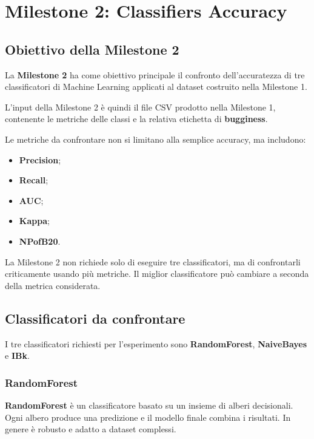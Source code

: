 \chapter{Milestone 2: Classifiers Accuracy}

\section{Obiettivo della Milestone 2}

La \textbf{Milestone 2} ha come obiettivo principale il confronto dell'accuratezza di tre classificatori di Machine Learning applicati al dataset costruito nella Milestone 1.

L'input della Milestone 2 è quindi il file CSV prodotto nella Milestone 1, contenente le metriche delle classi e la relativa etichetta di \textbf{bugginess}.

Le metriche da confrontare non si limitano alla semplice accuracy, ma includono:

\begin{itemize}
    \item \textbf{Precision};
    \item \textbf{Recall};
    \item \textbf{AUC};
    \item \textbf{Kappa};
    \item \textbf{NPofB20}.
\end{itemize}

\begin{notaesame}
La Milestone 2 non richiede solo di eseguire tre classificatori, ma di confrontarli criticamente usando più metriche. Il miglior classificatore può cambiare a seconda della metrica considerata.
\end{notaesame}

\section{Classificatori da confrontare}

\begin{notaslide}
I tre classificatori richiesti per l'esperimento sono \textbf{RandomForest}, \textbf{NaiveBayes} e \textbf{IBk}.
\end{notaslide}

\subsection{RandomForest}

\textbf{RandomForest} è un classificatore basato su un insieme di alberi decisionali. Ogni albero produce una predizione e il modello finale combina i risultati. In genere è robusto e adatto a dataset complessi.

